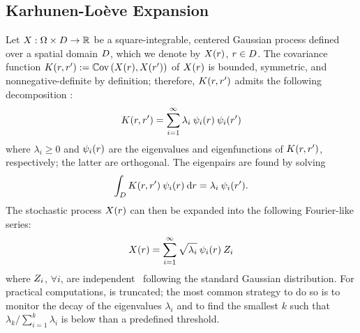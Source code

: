 \subsection{Karhunen-Lo\`{e}ve Expansion}
Let $X: \Omega \times D \to \mathbb{R}$ be a square-integrable, centered Gaussian process defined over a spatial domain $D$, which we denote by $X(r)$, $r \in D$. The covariance function $\fCov{\r, \r'} := \Cov{X(\r), X(\r')}$ of $X(r)$ is bounded, symmetric, and nonnegative-definite by definition; therefore, $\fCov{\r, \r'}$ admits the following decomposition \cite{maitre2010}:
\[
  \fCov{\r, \r'} = \sum_{i = 1}^\infty \lambda_i \: \klb_i(\r) \: \klb_i(\r')
\]
where $\lambda_i \geq 0$ and $\psi_i(r)$ are the eigenvalues and eigenfunctions of $\fCov{\r, \r'}$, respectively; the latter are orthogonal. The eigenpairs are found by solving
\begin{equation} \elabel{kl-eigenpairs}
  \int_\domain \fCov{\r, \r'} \: \klb_i (\r) \: \d\r = \lambda_i \: \klb_i(\r').
\end{equation}
The stochastic process $X(r)$ can then be expanded into the following Fourier-like series:
\begin{equation} \elabel{kl-expansion}
  X(\r) = \sum_{i = 1}^\infty \sqrt{\lambda_i} \: \klb_i(\r) \: \Z_i
\end{equation}
where $Z_i$, $\forall i$, are independent \rvs\ following the standard Gaussian distribution. For practical computations,  is truncated; the most common strategy to do so is to monitor the decay of the eigenvalues $\lambda_i$ and to find the smallest $k$ such that $\lambda_k / \sum_{i = 1}^k \lambda_i$ is below than a predefined threshold.

